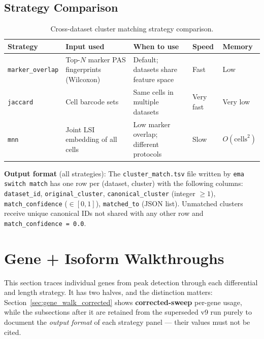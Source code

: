\documentclass[11pt,a4paper]{article}
\begin{document}
\subsection{Strategy Comparison}

\begin{table}[htbp]
  \centering
  \caption{Cross-dataset cluster matching strategy comparison.}
  \label{tab:match_compare}
  \begin{tabularx}{\textwidth}{lXXll}
    \toprule
    \textbf{Strategy} & \textbf{Input used} & \textbf{When to use} &
    \textbf{Speed} & \textbf{Memory} \\
    \midrule
    \texttt{marker\_overlap} &
      Top-$N$ marker PAS fingerprints (Wilcoxon) &
      Default; datasets share feature space &
      Fast & Low \\[4pt]
    \texttt{jaccard} &
      Cell barcode sets &
      Same cells in multiple datasets &
      Very fast & Very low \\[4pt]
    \texttt{mnn} &
      Joint LSI embedding of all cells &
      Low marker overlap; different protocols &
      Slow & $O(\text{cells}^2)$ \\
    \bottomrule
  \end{tabularx}
\end{table}

\textbf{Output format} (all strategies): The \texttt{cluster\_match.tsv} file written
by \texttt{ema switch match} has one row per (dataset, cluster) with the following columns:
\texttt{dataset\_id}, \texttt{original\_cluster}, \texttt{canonical\_cluster} (integer $\geq 1$),
\texttt{match\_confidence} ($\in [0, 1]$), \texttt{matched\_to} (JSON list). Unmatched
clusters receive unique canonical IDs not shared with any other row and
\texttt{match\_confidence = 0.0}.

\section{Gene + Isoform Walkthroughs}
\label{sec:walkthroughs}

This section traces individual genes from peak detection through each
differential and length strategy. It has two halves, and the distinction
matters: Section~\ref{sec:gene_walk_corrected} shows \textbf{corrected-sweep}
per-gene usage, while the subsections after it are retained from the superseded
v9 run purely to document the \emph{output format} of each strategy panel ---
their values must not be cited.
\end{document}
